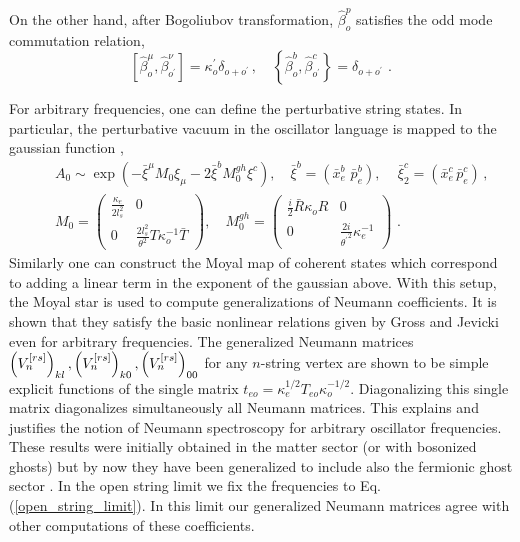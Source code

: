 \documentclass[a4paper,aps,preprint,nofootinbib,eqsecnum]{revtex4}
\begin{document}
On the other hand, after Bogoliubov transformation, $\hat{\beta}_{o}^{p}$
satisfies the odd mode commutation relation,
\begin{equation}
\left[ \hat{\beta}_{o}^{\mu },\hat{\beta}_{o^{\prime }}^{\nu }\right]
=\kappa _{o}^{\prime }\delta _{o+o^{\prime }}\,,\quad \left\{ \hat{\beta}%
_{o}^{b},\hat{\beta}_{o^{\prime }}^{c}\right\} =\delta _{o+o^{\prime }}\,\,.
\end{equation}

{}For arbitrary frequencies, one can define the perturbative string states.
In particular, the perturbative vacuum in the oscillator language is mapped
to the gaussian function \cite{BM2,PREP},
\begin{eqnarray}
&&A_{0}\sim \exp \left( -\bar{\xi}^{\mu }M_{0}\xi _{\mu }-2\bar{\xi}%
^{b}M_{0}^{gh}\xi ^{c}\right) ,\quad \bar{\xi}^{b}=
(\bar{x}_{e}^{b}\,\,\bar{p}%
_{e}^{b}),\,\quad \bar{\xi}_{2}^{c}=(\bar{x}_{e}^{c}\,\bar{p}_{e}^{c})\,, \\
&&M_{0}=\left(
\begin{array}{cc}
\frac{\kappa _{e}}{2l_{s}^{2}} & 0 \\
0 & \frac{2l_{s}^{2}}{\theta ^{2}}T\kappa _{o}^{-1}\bar{T}%
\end{array}%
\right) ,\quad M_{0}^{gh}=\left(
\begin{array}{cc}
\frac{i}{2}\bar{R}\kappa _{o}R & 0 \\
0 & \frac{2i}{{\theta ^{\prime }}^{2}}\kappa _{e}^{-1}%
\end{array}%
\right) \,\,.  \label{vac}
\end{eqnarray}%
Similarly one can construct the Moyal map of coherent states which
correspond to adding a linear term in the exponent of the gaussian above.
With this setup, the Moyal star is used to compute generalizations of
Neumann coefficients. It is shown \cite{BM2} that they satisfy the basic
nonlinear relations given by Gross and Jevicki even for arbitrary
frequencies. The generalized Neumann matrices $\left( V_{n}^{\left[ rs\right]
}\right) _{kl},\left( V_{n}^{\left[ rs\right] }\right) _{k0},\left( V_{n}^{%
\left[ rs\right] }\right) _{00}$ for any $n$-string vertex are
shown to be simple explicit functions of the single matrix
$t_{eo}=\kappa _{e}^{1/2}T_{eo}\kappa _{o}^{-1/2}.$ Diagonalizing
this single matrix diagonalizes simultaneously all Neumann
matrices. This explains and justifies the notion of Neumann
spectroscopy for arbitrary oscillator frequencies. These results
were initially obtained in the matter sector (or with bosonized
ghosts) but by now they have been generalized to include also the
fermionic ghost sector \cite{PREP}. In the open string limit we
fix the frequencies to Eq.(\ref{open_string_limit}). In this limit
our generalized Neumann matrices agree with other computations of
these coefficients.
\end{document}
